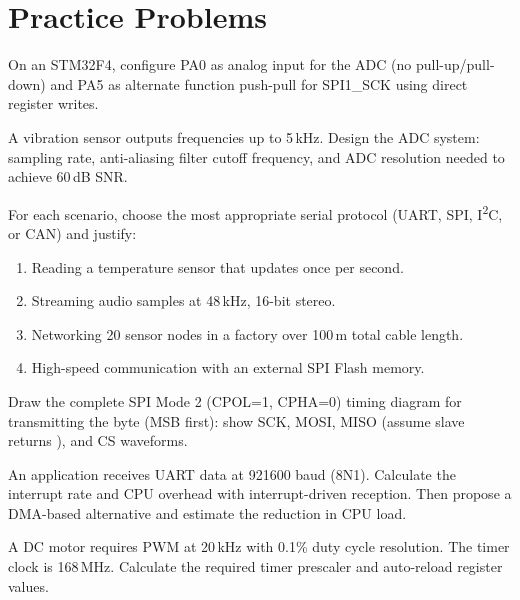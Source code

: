 \section{Practice Problems}
\label{sec:io:practice}

\begin{exercise}
On an STM32F4, configure PA0 as analog input for the ADC (no pull-up/pull-down) and PA5 as alternate function push-pull for SPI1\_SCK using direct register writes.
\end{exercise}

\begin{exercise}
A vibration sensor outputs frequencies up to 5\,kHz. Design the ADC system: sampling rate, anti-aliasing filter cutoff frequency, and ADC resolution needed to achieve 60\,dB SNR.
\end{exercise}

\begin{exercise}
For each scenario, choose the most appropriate serial protocol (UART, SPI, I\textsuperscript{2}C, or CAN) and justify:
\begin{enumerate}[label=(\alph*)]
  \item Reading a temperature sensor that updates once per second.
  \item Streaming audio samples at 48\,kHz, 16-bit stereo.
  \item Networking 20 sensor nodes in a factory over 100\,m total cable length.
  \item High-speed communication with an external SPI Flash memory.
\end{enumerate}
\end{exercise}

\begin{exercise}
Draw the complete SPI Mode 2 (CPOL=1, CPHA=0) timing diagram for transmitting the byte  (MSB first): show SCK, MOSI, MISO (assume slave returns ), and CS waveforms.
\end{exercise}

\begin{exercise}
An application receives UART data at 921600 baud (8N1). Calculate the interrupt rate and CPU overhead with interrupt-driven reception. Then propose a DMA-based alternative and estimate the reduction in CPU load.
\end{exercise}

\begin{exercise}
A DC motor requires PWM at 20\,kHz with 0.1\% duty cycle resolution. The timer clock is 168\,MHz. Calculate the required timer prescaler and auto-reload register values.
\end{exercise}
